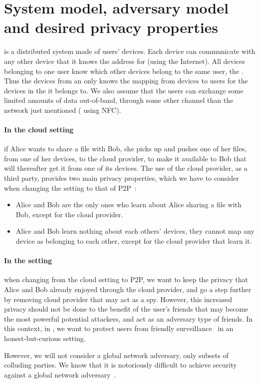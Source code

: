 \section{System model, adversary model and desired privacy properties}%
\label{system-model}

\name is a distributed system made of users' devices. 
Each device can communicate with any other device that it knows the
address for (\eg using the Internet). All devices belonging to one user
 know which other devices belong to the same user, \ie the \squad.
Thus the devices from an \squad only knows the mapping from devices to users for the devices in 
the \squad it belongs to.
We also assume that the users can exchange some limited amounts of data 
out-of-band, \ie through some other channel than the network just mentioned (\eg 
using \ac{NFC}).

\paragraph*{In the cloud setting} if Alice wants to share a file with
Bob, she picks up and pushes one of her files, from one of her devices, to the cloud
provider, to make it available to Bob that will thereafter get it from
one of its devices. The use of the cloud provider, as a third party,
provides two main privacy properties, which we have to consider when
changing the setting to that of \ac{P2P}~\cite{DevilInMetadata}:
\begin{itemize}
\item Alice and Bob are the only ones who learn 
about Alice sharing a file with Bob, except for the cloud provider.
\item Alice and Bob learn nothing about each others' devices, \ie 
they cannot map any device as belonging to each other, except for the
cloud provider that learn it.
\end{itemize} 

\paragraph*{In the \name setting} when changing from the cloud setting
to \ac{P2P}, we want to keep the privacy that Alice and Bob already
enjoyed through the cloud provider, and go a step further by removing 
cloud provider that may act as a spy. However, this increased privacy
should not be done to the benefit of the user's friends that may
become the most powerful potential attackers, and act
as an adversary type of friends.
In this context, in \name, we want to protect users from friendly
surveillance~\cite{FriendlySurveillance} in an honest-but-curious setting.

However, we will not consider a global network adversary, only subsets of colluding 
parties. We know that it is notoriously difficult to achieve security against a global 
network adversary~\cite{SystemsForAnonymousCommunication}.
